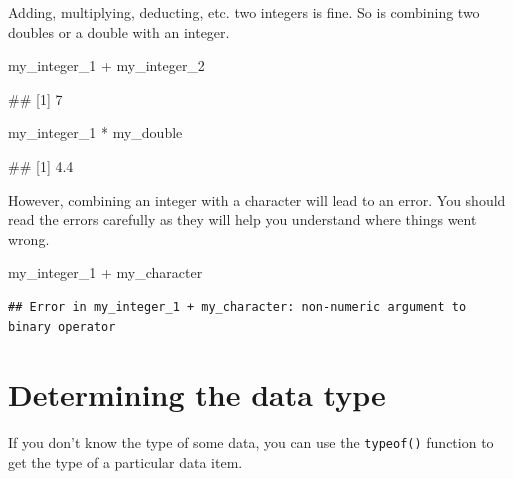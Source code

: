 \documentclass[
]{book}
\newenvironment{Shaded}{\begin{snugshade}}{\end{snugshade}}
\newcommand{\NormalTok}[1]{#1}
\newcommand{\SpecialCharTok}[1]{\textcolor[rgb]{0.00,0.00,0.00}{#1}}
\begin{document}
Adding, multiplying, deducting, etc. two integers is fine. So is combining two doubles or a double with an integer.

\begin{Shaded}
\begin{Highlighting}[]
\NormalTok{my\_integer\_1 }\SpecialCharTok{+}\NormalTok{ my\_integer\_2}
\end{Highlighting}
\end{Shaded}

\begin{Shaded}
\begin{Highlighting}[]
\NormalTok{\#\# [1] 7}
\end{Highlighting}
\end{Shaded}

\begin{Shaded}
\begin{Highlighting}[]
\NormalTok{my\_integer\_1 }\SpecialCharTok{*}\NormalTok{ my\_double}
\end{Highlighting}
\end{Shaded}

\begin{Shaded}
\begin{Highlighting}[]
\NormalTok{\#\# [1] 4.4}
\end{Highlighting}
\end{Shaded}

However, combining an integer with a character will lead to an error. You should read the errors carefully as they will help you understand where things went wrong.

\begin{Shaded}
\begin{Highlighting}[]
\NormalTok{my\_integer\_1 }\SpecialCharTok{+}\NormalTok{ my\_character}
\end{Highlighting}
\end{Shaded}

\begin{verbatim}
## Error in my_integer_1 + my_character: non-numeric argument to binary operator
\end{verbatim}

\hypertarget{determining-the-data-type}{%
\section{Determining the data type}\label{determining-the-data-type}}

If you don't know the type of some data, you can use the \texttt{typeof()} function to get the type of a particular data item.
\end{document}
